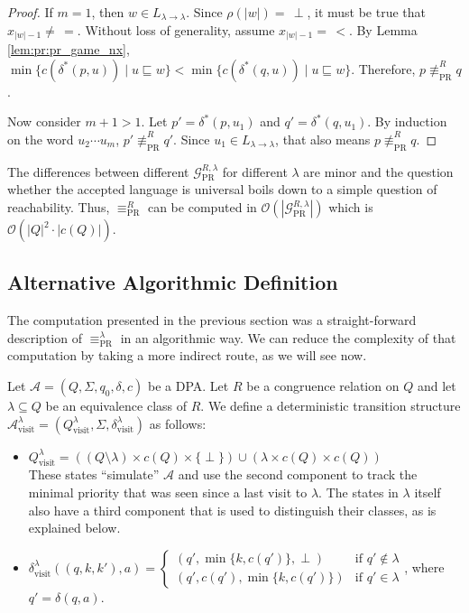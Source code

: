 \begin{proof}
	If $m = 1$, then $w \in L_{\lambda \rightarrow \lambda}$. Since $\rho(|w|) =\, \perp$, it must be true that $x_{|w|-1} \neq\, =$. Without loss of generality, assume $x_{|w|-1} =\, <$. By Lemma \ref{lem:pr:pr_game_nx}, $\min \{ c(\delta^*(p, u)) \mid u \sqsubseteq w \} < \min \{ c(\delta^*(q, u)) \mid u \sqsubseteq w \}$. Therefore, $p \not\equiv_\text{PR}^R q$.
	
	Now consider $m+1 > 1$. Let $p' = \delta^*(p, u_1)$ and $q' = \delta^*(q, u_1)$. By induction on the word $u_2 \cdots u_m$, $p' \not\equiv_\text{PR}^R q'$. Since $u_1 \in L_{\lambda \rightarrow \lambda}$, that also means $p \not\equiv_\text{PR}^R q$.
\end{proof}

The differences between different $\mathcal{G}_\text{PR}^{R,\lambda}$ for different $\lambda$ are minor and the question whether the accepted language is universal boils down to a simple question of reachability. Thus, $\equiv_\text{PR}^R$ can be computed in $\mathcal{O}(|\mathcal{G}_\text{PR}^{R,\lambda}|)$ which is $\mathcal{O}(|Q|^2 \cdot |c(Q)|)$.



\subsection{Alternative Algorithmic Definition}
The computation presented in the previous section was a straight-forward description of $\equiv_\text{PR}^\lambda$ in an algorithmic way. We can reduce the complexity of that computation by taking a more indirect route, as we will see now.

\begin{defn}
	Let $\mathcal{A} = (Q, \Sigma, q_0, \delta, c)$ be a DPA. Let $R$ be a congruence relation on $Q$ and let $\lambda \subseteq Q$ be an equivalence class of $R$. We define a deterministic transition structure $\mathcal{A}^\lambda_\text{visit} = (Q^\lambda_\text{visit}, \Sigma, \delta^\lambda_\text{visit})$ as follows:
	
	\begin{itemize}
		\item $Q^\lambda_\text{visit} = ((Q \setminus \lambda) \times c(Q) \times \{\perp\}) \cup (\lambda \times c(Q) \times c(Q))$ \\
		These states \enquote{simulate} $\mathcal{A}$ and use the second component to track the minimal priority that was seen since a last visit to $\lambda$. The states in $\lambda$ itself also have a third component that is used to distinguish their classes, as is explained below.
		\item $\delta^\lambda_\text{visit}((q, k, k'), a) = \begin{cases}
			(q', \min \{k, c(q')\}, \perp) & \text{if } q' \notin \lambda \\
			(q', c(q'), \min \{k, c(q')\}) & \text{if } q' \in \lambda
		\end{cases}$, where $q' = \delta(q, a)$.
	\end{itemize}
\end{defn}

